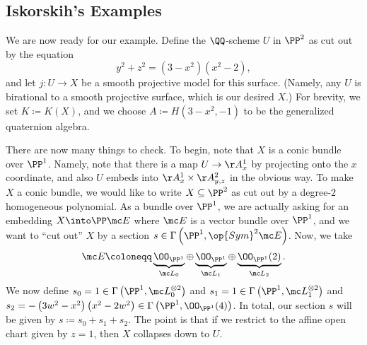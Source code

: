 \documentclass[../notes.tex]{subfiles}
\begin{document}
\subsection{Iskorskih's Examples}
We are now ready for our example. Define the $\QQ$-scheme $U$ in $\PP^2$ as cut out by the equation
\[y^2+z^2=\left(3-x^2\right)\left(x^2-2\right),\]
and let $j\colon U\to X$ be a smooth projective model for this surface. (Namely, any $U$ is birational to a smooth projective surface, which is our desired $X$.) For brevity, we set $K\coloneqq K(X)$, and we choose $A\coloneqq H\left(3-x^2,-1\right)$ to be the generalized quaternion algebra.

There are now many things to check. To begin, note that $X$ is a conic bundle over $\PP^1$. Namely, note that there is a map $U\to\AA^1_x$ by projecting onto the $x$ coordinate, and also $U$ embeds into $\AA^1_x\times\AA^2_{y,z}$ in the obvious way. To make $X$ a conic bundle, we would like to write $X\subseteq\PP^2$ as cut out by a degree-$2$ homogeneous polynomial. As a bundle over $\PP^1$, we are actually asking for an embedding $X\into\PP\mc E$ where $\mc E$ is a vector bundle over $\PP^1$, and we want to ``cut out'' $X$ by a section $s\in\Gamma\left(\PP^1,\op{Sym}^2\mc E\right)$. Now, we take
\[\mc E\coloneqq\underbrace{\OO_{\PP^1}}_{\mc L_0}\oplus\underbrace{\OO_{\PP^1}}_{\mc L_1}\oplus\underbrace{\OO_{\PP^1}(2)}_{\mc L_2}.\]
We now define $s_0=1\in\Gamma\left(\PP^1,\mc L_0^{\otimes2}\right)$ and $s_1=1\in\Gamma\left(\PP^1,\mc L_1^{\otimes2}\right)$ and $s_2=-\left(3w^2-x^2\right)\left(x^2-2w^2\right)\in\Gamma\left(\PP^1,\OO_{\PP^1}(4)\right)$. In total, our section $s$ will be given by $s\coloneqq s_0+s_1+s_2$. The point is that if we restrict to the affine open chart given by $z=1$, then $X$ collapses down to $U$.
\end{document}
